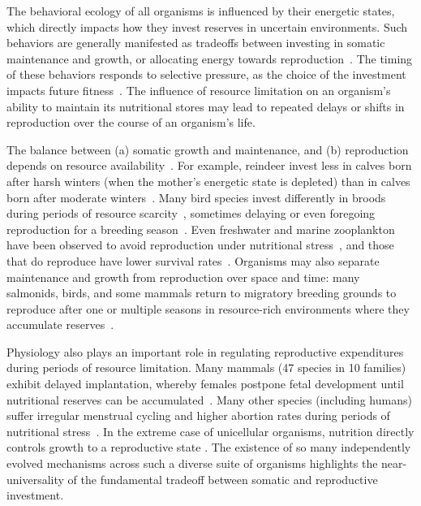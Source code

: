 \documentclass[twocolumn,preprintnumbers,amsmath,amssymb,superscriptaddress]{revtex4}
\begin{document}
\maketitle




The behavioral ecology of all organisms is influenced by their energetic
states, which directly impacts how they invest reserves in uncertain
environments.  Such behaviors are generally manifested as tradeoffs between
investing in somatic maintenance and growth, or allocating energy towards
reproduction~\citep{Martin:1987dl,Kirk:1997cc,Kempes:2012hy}.  The timing of
these behaviors responds to selective pressure, as the choice of the
investment impacts future
fitness~\citep{Mangel:1988uaa,Mangel:2014kz,Yeakel:2013hi}.  The influence of
resource limitation on an organism's ability to maintain its nutritional
stores may lead to repeated delays or shifts in reproduction over the course
of an organism's life.

The balance between (a) somatic growth and maintenance, and (b) reproduction depends on resource availability~\citep{Morris:1987eo}.
For example, reindeer invest less in calves born after harsh winters (when the mother's energetic state is depleted) than in calves born after moderate winters~\citep{Tveraa:2003fq}.
Many bird species invest differently in broods during periods of resource scarcity~\citep{Daan:1988va,Jacot:2009dv}, sometimes delaying or even foregoing reproduction for a breeding season~\citep{Martin:1987dl,Stearns:1989ip,Barboza:2002in}.
Even freshwater and marine zooplankton have been observed to avoid reproduction under nutritional stress~\citep{Threlkeld:1976ih}, and those that do reproduce have lower survival rates~\citep{Kirk:1997cc}.
Organisms may also separate maintenance and growth from reproduction over space and time: many salmonids, birds, and some mammals return to migratory breeding grounds to reproduce after one or multiple seasons in resource-rich environments where they accumulate reserves~\citep{Weber:1998jg,Mduma:1999cp,Moore:2014hi}.

Physiology also plays an important role in regulating reproductive expenditures during periods of resource limitation.
Many mammals (47 species in 10 families) exhibit delayed implantation, whereby females postpone fetal development until nutritional reserves can be accumulated~\citep{Mead:1989dt,Sandell:1990kw}.
Many other species (including humans) suffer irregular menstrual cycling and higher abortion rates during periods of nutritional stress~\citep{Bulik:1999eo,Trites:2003cc}.
In the extreme case of unicellular organisms, nutrition directly controls growth to a reproductive state \citep{Glazier:2009hq,Kempes:2012hy}. The existence of so many independently evolved mechanisms across such a diverse suite of organisms highlights the near-universality of the fundamental tradeoff between somatic and reproductive investment.
\end{document}
